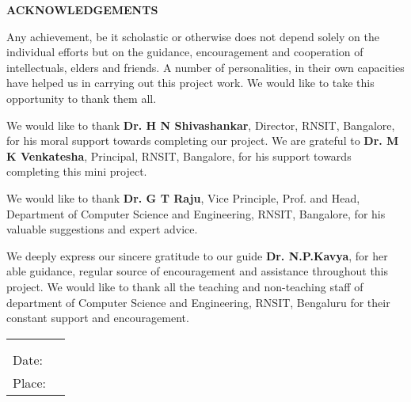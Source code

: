 \thispagestyle{empty}
\begin{center}
\textup{\large{\textbf{ACKNOWLEDGEMENTS}}} \\[0.1in]
\end{center}

\justify
\indent
Any achievement, be it scholastic or otherwise does not depend solely on the individual efforts but on the guidance, encouragement and cooperation of intellectuals, elders and friends. A number of personalities, in their own capacities have helped us in carrying out this project work. We would like to take this opportunity to thank them all.

We would like to thank \textbf{Dr. H N Shivashankar}, Director, RNSIT, Bangalore, for his moral support towards completing our project. We are grateful to \textbf{Dr. M K Venkatesha}, Principal, RNSIT, Bangalore, for his support towards completing this mini project.

We would like to thank \textbf{Dr. G T Raju}, Vice Principle, Prof. and Head, Department of
Computer Science and Engineering, RNSIT, Bangalore, for his valuable suggestions and expert advice.

We deeply express our sincere gratitude to our guide \textbf{Dr. N.P.Kavya}, for her able guidance, regular source of encouragement and assistance throughout this project.
We would like to thank all the teaching and non-teaching staff of department of Computer Science and Engineering, RNSIT, Bengaluru for their constant support and encouragement.

\vfill

\justify
\begin{tabularx}{\linewidth}{X X}
 & {\hfill}\textup{ }\\ 
  & {\hfill}\textup{ }\\ 
 \textup{Date:} & {\hfill}\textup{ }\\
\textup{Place:} & {\hfill}\textup{ }\\
\end{tabularx}


\pagebreak